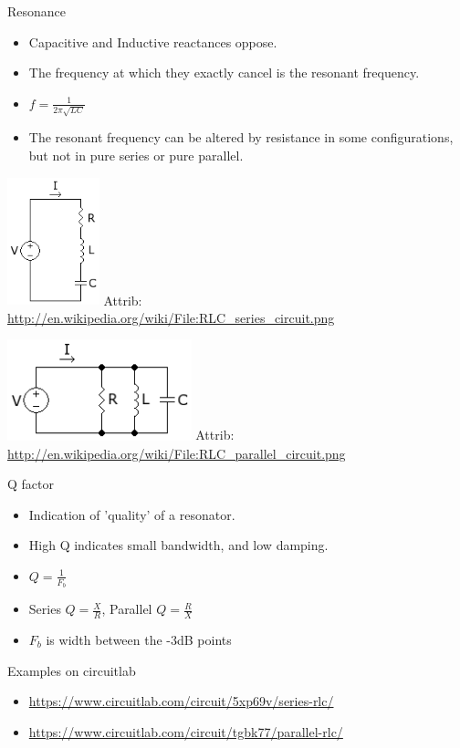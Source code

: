 \documentclass{beamer}
\begin{document}
\begin{frame}{Resonance}{}
\begin{itemize}
\item Capacitive and Inductive reactances oppose.
\item The frequency at which they exactly cancel is the resonant frequency.
\item $f=\frac{1}{2\pi\sqrt{LC}}$
\item The resonant frequency can be altered by resistance in some configurations, but not in pure series or pure parallel. 
\end{itemize}

\parbox{0.48\textwidth}{
\includegraphics[width=0.2\textwidth]{images/RLC_series_circuit.png}
Attrib: \url{http://en.wikipedia.org/wiki/File:RLC_series_circuit.png}
}
\parbox{0.48\textwidth}{
\includegraphics[width=0.4\textwidth]{images/RLC_parallel_circuit.png}
Attrib: \url{http://en.wikipedia.org/wiki/File:RLC_parallel_circuit.png}
}
\end{frame}
\begin{frame}{Q factor}{}
\begin{itemize}
\item Indication of 'quality' of a resonator.
\item High Q indicates small bandwidth, and low damping.
\item $Q=\frac{1}{F_b}$
\item Series $Q=\frac{X}{R}$, Parallel $Q=\frac{R}{X}$
\item $F_b$ is width between the -3dB points
\end{itemize}

\end{frame}

\begin{frame}{Examples on circuitlab}{}
\begin{itemize}
\item \url{https://www.circuitlab.com/circuit/5xp69v/series-rlc/}
\item \url{https://www.circuitlab.com/circuit/tgbk77/parallel-rlc/}
\end{itemize}
\end{frame}
\end{document}
